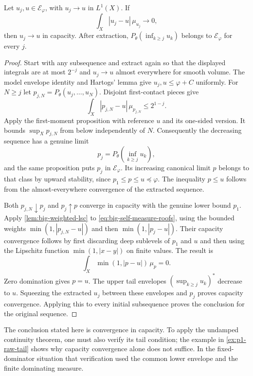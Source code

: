 \begin{theorem}\label{thm:big-relative-self-measure-convergence}
Let $u_j,u\in\mathcal E_\varphi$, with $u_j\to u$ in $L^1(X)$. If
\[
 \int_X|u_j-u|\,\mu_{u_j}\longrightarrow0,
\]
then $u_j\to u$ in capacity. After extraction, $P_\theta(\inf_{k\geq j}u_k)$ belongs to $\mathcal E_\varphi$ for every $j$.
\end{theorem}
\begin{proof}
Start with any subsequence and extract again so that the displayed integrals are at most $2^{-j}$ and $u_j\to u$ almost everywhere for smooth volume. The model envelope identity and Hartogs' lemma give $u_j,u\leq\varphi+C$ uniformly. For $N\geq j$ let $p_{j,N}=P_\theta(u_j,\ldots,u_N)$. Disjoint first-contact pieces give
\begin{equation}\label{eq:big-self-measure-roofs}
 \int_X|p_{j,N}-u|\,\mu_{p_{j,N}}\leq2^{1-j}.
\end{equation}
Apply the first-moment proposition with reference $u$ and its one-sided version. It bounds $\sup_Xp_{j,N}$ from below independently of $N$. Consequently the decreasing sequence has a genuine limit
\[
 p_j=P_\theta\left(\inf_{k\geq j}u_k\right),
\]
and the same proposition puts $p_j$ in $\mathcal E_\varphi$. Its increasing canonical limit $p$ belongs to that class by upward stability, since $p_1\leq p\leq u\preceq\varphi$. The inequality $p\leq u$ follows from the almost-everywhere convergence of the extracted sequence.

Both $p_{j,N}\downarrow p_j$ and $p_j\uparrow p$ converge in capacity with the genuine lower bound $p_1$. Apply \cref{lem:big-weighted-lsc} to \eqref{eq:big-self-measure-roofs}, using the bounded weights $\min(1,|p_{j,N}-u|)$ and then $\min(1,|p_j-u|)$. Their capacity convergence follows by first discarding deep sublevels of $p_1$ and $u$ and then using the Lipschitz function $\min(1,|x-y|)$ on finite values. The result is
\[
 \int_X\min(1,|p-u|)\,\mu_p=0.
\]
Zero domination gives $p=u$. The upper tail envelopes $(\sup_{k\geq j}u_k)^*$ decrease to $u$. Squeezing the extracted $u_j$ between these envelopes and $p_j$ proves capacity convergence. Applying this to every initial subsequence proves the conclusion for the original sequence.
\end{proof}

The conclusion stated here is convergence in capacity. To apply the undamped continuity theorem, one must also verify its tail condition; the example in \cref{ex:p1-raw-tail} shows why capacity convergence alone does not suffice. In the fixed-dominator situation that verification used the common lower envelope and the finite dominating measure.
